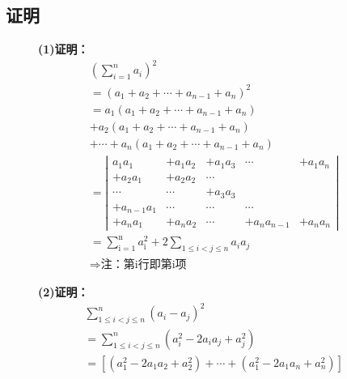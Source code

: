 \documentclass[fontset=windows]{article}
\begin{document}
    \subsection{证明}
    \begin{figure}[!htb]
    \begin{minipage}[t]{0.5\linewidth}
    \textbf{(1)证明：}
    \begin{align}
        &\left(\sum\limits_{i=1}^{n} a_{i}\right)^{2}\nonumber\\
        &=\left(a_{1}+a_{2}+\cdots+a_{n-1}+a_{n}\right)^{2}\nonumber\\
        &=a_{1}\left(a_{1}+a_{2}+\cdots+a_{n-1}+a_{n}\right)\nonumber\\
        &+a_{2}\left(a_{1}+a_{2}+\cdots+a_{n-1}+a_{n}\right)\nonumber\\
        &+\cdots+a_{n}\left(a_{1}+a_{2}+\cdots+a_{n-1}+a_{n}\right)\nonumber\\
        &=\left|
        \begin{array}{ccccc}
            a_{1} a_{1} & +a_{1} a_{2} & +a_{1} a_{3} & \cdots & +a_{1} a_{n} \\
            +a_{2} a_{1} & +a_{2} a_{2} & \cdots & & \\
            \cdots & \cdots & +a_{3} a_{3} & & \\
            +a_{n-1} a_{1} & \cdots & \cdots & \cdots & \\
            +a_{n} a_{1} & +a_{n} a_{2} & \cdots & +a_{n} a_{n-1} & +a_{n} a_{n}
        \end{array}
        \right|\nonumber\\
        &=\sum\limits_{\mathrm{i}=1}^{\mathrm{n}} a_{\mathrm{i}}^{2}+2 \sum\limits_{1 \leq i<j \leq n} a_{i} a_{j}\nonumber\\
        &\Longrightarrow \text{注：第i行即第i项}\nonumber
    \end{align}
    \end{minipage}
    \vline
    \begin{minipage}[t]{0.5\linewidth}
    \textbf{(2)证明：}
    \begin{align}
        &\sum_{1 \leq i<j \leq n}^{n}\left(a_{i}-a_{j}\right)^{2}\nonumber\\
        &=\sum_{1 \leq i<j \leq n}^{n}\left(a_{i}^{2}-2 a_{i} a_{j}+a_{j}^{2}\right)\nonumber\\
        &=\left[\left(a_{1}^{2}-2 a_{1} a_{2}+a_{2}^{2}\right)+\cdots+\left(a_{1}^{2}-2 a_{1} a_{n}+a_{n}^{2}\right)\right]\nonumber\\

\end{align}
\end{minipage}
\end{figure}
\end{document}
